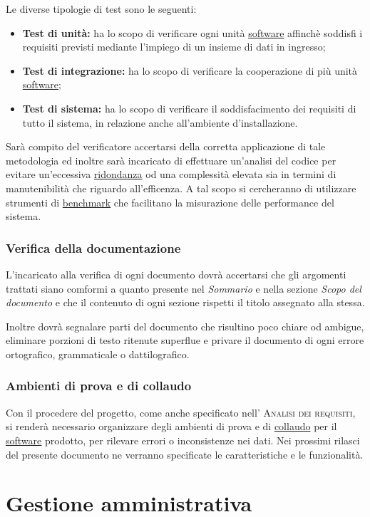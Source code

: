 \documentclass[11pt,a4paper]{article}
\begin{document}
Le diverse tipologie di test sono le seguenti:
\begin{itemize}
	\item \textbf{Test di unità:} ha lo scopo di verificare ogni unità \underline{software} affinchè soddisfi i requisiti previsti mediante l’impiego di un insieme di dati in ingresso;
	\item \textbf{Test di integrazione:} ha lo scopo di verificare la cooperazione di più unità \underline{software};
	\item \textbf{Test di sistema:} ha lo scopo di verificare il soddisfacimento dei requisiti di tutto il sistema, in relazione anche all'ambiente d'installazione.
\end{itemize}
Sarà compito del verificatore accertarsi della corretta applicazione di tale metodologia ed inoltre sarà incaricato di effettuare un'analisi del codice per evitare un'eccessiva \underline{ridondanza} od una complessità elevata sia in termini di manutenibilità che riguardo all'efficenza. A tal scopo si cercheranno di utilizzare strumenti di \underline{benchmark} che facilitano la misurazione delle performance del sistema.
\subsubsection{Verifica della documentazione}
L'incaricato alla verifica di ogni documento dovrà accertarsi che gli argomenti trattati siano comformi a quanto presente nel \textit{Sommario} e nella sezione \textit{Scopo del documento} e che il contenuto di ogni sezione rispetti il titolo assegnato alla stessa.

Inoltre dovrà segnalare parti del documento che risultino poco chiare od ambigue, eliminare porzioni di testo ritenute superflue e privare il documento di ogni errore ortografico, grammaticale o dattilografico. 
\subsubsection{Ambienti di prova e di collaudo}
Con il procedere del progetto, come anche specificato nell' \textsc{Analisi dei requisiti}, si renderà necessario organizzare degli ambienti di prova e di \underline{collaudo} per il \underline{software} prodotto, per rilevare errori o inconsistenze nei dati. Nei prossimi rilasci del presente documento ne verranno specificate le caratteristiche e le funzionalità.
\section{Gestione amministrativa}
\end{document}
